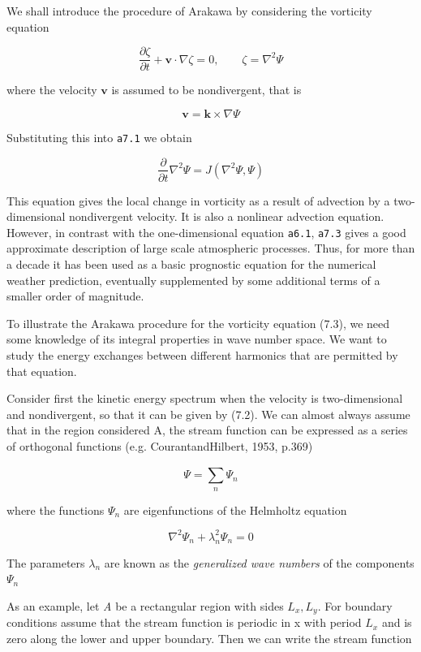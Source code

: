 We shall introduce the procedure of Arakawa by considering the vorticity
equation

\[\frac{\partial\zeta}{\partial t} + \textbf{v} \cdot\nabla\zeta = 0,\qquad \zeta = \nabla^{2}\Psi\]

where the velocity \(\textbf{v}\) is assumed to be nondivergent, that is

\[\textbf{v} = \textbf{k} \times \nabla\Psi\]

Substituting this into \texttt{a7.1} we obtain

\[\frac{\partial}{\partial t}\nabla^{2}\Psi = J\left( \nabla^2\Psi, \Psi \right)\]

This equation gives the local change in vorticity as a result of
advection by a two-dimensional nondivergent velocity. It is also a
nonlinear advection equation. However, in contrast with the
one-dimensional equation \texttt{a6.1}, \texttt{a7.3} gives a good
approximate description of large scale atmospheric processes. Thus, for
more than a decade it has been used as a basic prognostic equation for
the numerical weather prediction, eventually supplemented by some
additional terms of a smaller order of magnitude.

To illustrate the Arakawa procedure for the vorticity equation (7.3), we
need some knowledge of its integral properties in wave number space. We
want to study the energy exchanges between different harmonics that are
permitted by that equation.

Consider first the kinetic energy spectrum when the velocity is
two-dimensional and nondivergent, so that it can be given by (7.2). We
can almost always assume that in the region considered A, the stream
function can be expressed as a series of orthogonal functions (e.g.
CourantandHilbert, 1953, p.369)

\[\Psi = \sum_{n}^{}\Psi_{n}\]

where the functions \(\Psi_n\) are eigenfunctions of the Helmholtz
equation

\[\nabla^{2}\Psi_{n} + \lambda_{n}^{2}\Psi_{n} = 0\]

The parameters \(\lambda_{n} \) are known as the \emph{generalized wave
numbers} of the components \(\Psi_{n}\)

As an example, let \emph{A} be a rectangular region with sides
\(L_x, L_y\). For boundary conditions assume that the stream function is
periodic in x with period \(L_{x}\) and is zero along the lower and
upper boundary. Then we can write the stream function

